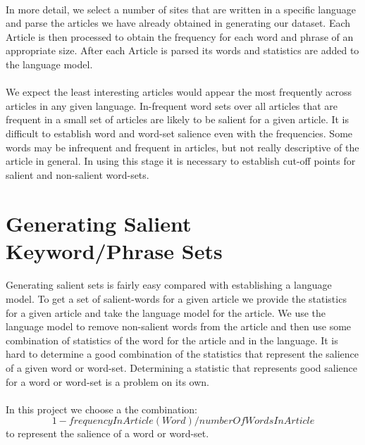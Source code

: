 \documentclass[12pt]{article}
\begin{document}
\paragraph{}
In more detail, we select a number of sites that are written in a specific language and parse the articles
we have already obtained in generating our dataset. Each Article is then processed to obtain the frequency
for each word and phrase of an appropriate size. After each Article is parsed its words and statistics are
added to the language model.

\paragraph{}
We expect the least interesting articles would appear the most frequently across articles in any given 
language. In-frequent word sets over all articles that are frequent in a small set of articles are likely 
to be salient for a given article. It is difficult to establish word and word-set salience even with the 
frequencies. Some words may be infrequent and frequent in articles, but not really descriptive of the 
article in general. In using this stage it is necessary to establish cut-off points for salient and 
non-salient word-sets.

\section{Generating Salient Keyword/Phrase Sets}

\paragraph{}
Generating salient sets is fairly easy compared with establishing a language model. To get a set of 
salient-words for a given article we provide the statistics for a given article and take the language 
model for the article. We use the language model to remove non-salient words from the article and then 
use some combination of statistics of the word for the article and in the language. It is hard to
determine a good combination of the statistics that represent the salience of a given word or word-set. 
Determining a statistic that represents good salience for a word or word-set is a problem on its own.
\paragraph{}
In this project we choose a the combination:
$$1-frequencyInArticle(Word)/numberOfWordsInArticle$$
to represent the salience of a word or word-set.
\end{document}
